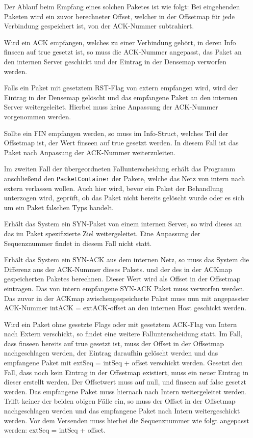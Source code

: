 \documentclass[../review_3.tex]{subfiles}
\begin{document}
Der Ablauf beim Empfang eines solchen Paketes ist wie folgt: Bei eingehenden Paketen wird ein zuvor berechneter Offset, welcher in der Offsetmap für jede Verbindung gespeichert ist, von der ACK-Nummer subtrahiert.

Wird ein ACK empfangen, welches zu einer Verbindung gehört, in deren Info finseen auf true gesetzt ist, so muss die ACK-Nummer angepasst, das Paket an den internen Server geschickt und der Eintrag in der Densemap verworfen werden.

Falls ein Paket mit gesetztem RST-Flag von extern empfangen wird, wird der Eintrag in der Densemap gelöscht und das empfangene Paket an den internen Server weitergeleitet. Hierbei muss keine Anpassung der ACK-Nummer vorgenommen werden.

Sollte ein FIN empfangen werden, so muss im Info-Struct, welches Teil der Offsetmap ist, der Wert finseen auf true gesetzt werden. In diesem Fall ist das Paket nach Anpassung der ACK-Nummer weiterzuleiten.

Im zweiten Fall der übergeordneten Fallunterscheidung erhält das Programm anschließend den \texttt{PacketContainer} der Pakete, welche das Netz von intern nach extern verlassen wollen. Auch hier wird, bevor ein Paket der Behandlung unterzogen wird, geprüft, ob das Paket nicht bereits gelöscht wurde oder es sich um ein Paket falschen Typs handelt.

Erhält das System ein SYN-Paket von einem internen Server, so wird dieses an das im Paket spezifizierte Ziel weitergeleitet. Eine Anpassung der Sequenznummer findet in diesem Fall nicht statt.

Erhält das System ein SYN-ACK aus dem internen Netz, so muss das System die Differenz aus der ACK-Nummer dieses Pakets. und der des in der ACKmap gespeicherten Paketes berechnen. Dieser Wert wird als Offset in der Offsetmap eintragen. Das von intern empfangene SYN-ACK Paket muss verworfen werden.
Das zuvor in der ACKmap zwischengespeicherte Paket muss nun mit angepasster ACK-Nummer intACK = extACK-offset an den internen Host geschickt werden.

Wird ein Paket ohne gesetzte Flags oder mit gesetztem ACK-Flag von Intern nach Extern verschickt, so findet eine weitere Fallunterscheidung statt.
Im Fall, dass finseen bereits auf true gesetzt ist, muss der Offset in der Offsetmap nachgeschlagen werden, der Eintrag daraufhin gelöscht werden und das empfangene Paket mit extSeq = intSeq + offset verschickt werden.
Gesetzt den Fall, dass noch kein Eintrag in der Offsetmap existiert, muss ein neuer Eintrag in dieser erstellt werden. Der Offsetwert muss auf null, und finseen auf false gesetzt werden. Das empfangene Paket muss hiernach nach Intern weitergeleitet werden.
Trifft keiner der beiden obigen Fälle ein, so muss der Offset in der Offsetmap nachgeschlagen werden und das empfangene Paket nach Intern weitergeschickt werden. Vor dem Versenden muss hierbei die Sequenznummer wie folgt angepasst werden: extSeq = intSeq + offset.
\end{document}
